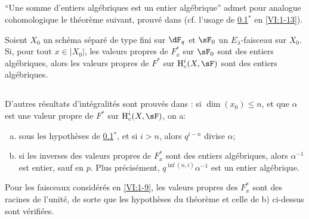 \subsection{}\label{VI:2-1}

``Une somme d'entiers algébriques est un entier algébrique'' admet pour 
analogue cohomologique le théorème suivant, prouvé dans 
\cite[XXI 5.2.2]{sga7} (cf. l'usage de \ref{VI:2-1}$^\ast$ en 
\ref{VI:1-13}). 





\begin{theorem*}[2.1*]\label{VI:2-1*}
Soient $X_0$ un schéma séparé de type fini sur $\dF_q$ et $\sF_0$ un 
$E_\lambda$-faisceau sur $X_0$. Si, pour tout $x\in |X_0|$, les valeurs 
propres de $F_x^\ast$ sur $\sF_0$ sont des entiers algébriques, alors les 
valeurs propres de $F^\ast$ sur $\h_c^i(X,\sF)$ sont des entiers algébriques. 
\end{theorem*}





\subsection{}\label{VI:2-2}

D'autres résultats d'intégralités sont prouvés dans 
\cite[XXI, 5.2.2 et 5.4]{sga7}: si $\dim(x_0)\leqslant n$, et que $\alpha$ est 
une valeur propre de $F^\ast$ sur $\h_c^i(X,\sF)$, on a: 
\begin{enumerate}[a)]
  \item sous les hypothèses de \ref{VI:2-1}$^\ast$, et si $i>n$, alors 
    $q^{i-n}$ divise $\alpha$;
  \item si les inverses des valeurs propres de $F_x^\ast$ sont des entiers 
    algébriques, alors $\alpha^{-1}$ est entier, sauf en $p$. Plus 
    précisément, $q^{\inf(n,i)}\alpha^{-1}$ est un entier algébrique. 
\end{enumerate}

Pour les faisceaux considérés en \ref{VI:1-9}, les valeurs propres des 
$F_x^\ast$ sont des racines de l'unité, de sorte que les hypothèses du 
théorème et celle de b) ci-dessus sont vérifiées. 





\subsection{}\label{VI:2-3}

